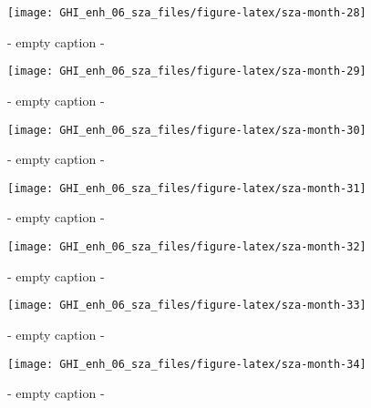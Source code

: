 \documentclass[
  10pt,
  a4paper,oneside]{article}
\begin{document}
\begin{figure}[H]

{\centering \texttt{[image: GHI\_enh\_06\_sza\_files/figure-latex/sza-month-28]} 

}

\caption{ - empty caption - }\label{fig:sza-month-28}
\end{figure}
\begin{figure}[H]

{\centering \texttt{[image: GHI\_enh\_06\_sza\_files/figure-latex/sza-month-29]} 

}

\caption{ - empty caption - }\label{fig:sza-month-29}
\end{figure}
\begin{figure}[H]

{\centering \texttt{[image: GHI\_enh\_06\_sza\_files/figure-latex/sza-month-30]} 

}

\caption{ - empty caption - }\label{fig:sza-month-30}
\end{figure}
\begin{figure}[H]

{\centering \texttt{[image: GHI\_enh\_06\_sza\_files/figure-latex/sza-month-31]} 

}

\caption{ - empty caption - }\label{fig:sza-month-31}
\end{figure}
\begin{figure}[H]

{\centering \texttt{[image: GHI\_enh\_06\_sza\_files/figure-latex/sza-month-32]} 

}

\caption{ - empty caption - }\label{fig:sza-month-32}
\end{figure}
\begin{figure}[H]

{\centering \texttt{[image: GHI\_enh\_06\_sza\_files/figure-latex/sza-month-33]} 

}

\caption{ - empty caption - }\label{fig:sza-month-33}
\end{figure}
\begin{figure}[H]

{\centering \texttt{[image: GHI\_enh\_06\_sza\_files/figure-latex/sza-month-34]} 

}

\caption{ - empty caption - }\label{fig:sza-month-34}
\end{figure}
\end{document}
